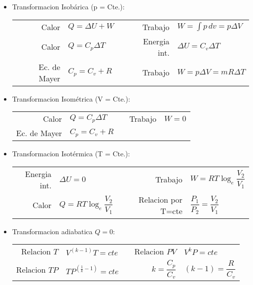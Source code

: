 \documentclass[a4paper, 11pt,titlepage]{book}
\begin{document}
\begin{tcolorbox}[title = \large\textbf{Transformaciones de gases}]

\begin{itemize}
\item Transformacion Isobárica (p = Cte.):	

	\begin{center}
			\begin{tabular}{r | l c r | l}
					\vspace{.3cm} Calor & $Q = \Delta U + W$ && Trabajo & $W = \int p\,dv = p \Delta V$\\
					\vspace{.3cm} Calor & $Q = C_p \Delta T$ && Energia int. & $\Delta U = C_v \Delta T $\\
					\vspace{.3cm} Ec. de Mayer & $C_p = C_v + R$ && Trabajo &$W = p \Delta V = mR\Delta T$ 
				\end{tabular}
		\end{center}
\item Transformacion Isométrica (V = Cte.):
		\begin{center}
		\begin{tabular}{r | l c r | l}
			\vspace{.3cm} Calor & $Q = C_p \Delta T$ && Trabajo &$W = 0 $\\
			\vspace{.3cm} Ec. de Mayer & $C_p = C_v + R$ && 
		\end{tabular}
     	\end{center}

\item Transformacion Isotérmica (T = Cte.):
       	\begin{center}
       	\begin{tabular}{r | l c r | l}
       		\vspace{.3cm} Energia int. & $\Delta U = 0$ && Trabajo &$W = RT \log_{e}\dfrac{V_2}{V_1} $\\
       		\vspace{.3cm} Calor & $Q =RT \log_{e}\dfrac{V_2}{V_1} $ && Relacion por T=cte& $\dfrac{P_1}{P_2}=\dfrac{V_2}{V_1} $
       	\end{tabular}
        \end{center}
\item Transformacion adiabatica $Q=0$:
       \begin{center}
        	\begin{tabular}{r | l c r | l}
        		\vspace{.3cm} Relacion $T$& $V^{(k-1)}T=cte$ && Relacion $PV$ &$V^kP = cte$\\
        		\vspace{.3cm} Relacion $TP$ & $ TP^{(\frac{1}{k}-1)}=cte $ && $k = \dfrac{C_p}{C_v}$& $(k - 1)=\dfrac{R}{C_v} $
        	\end{tabular}
       \end{center}


\end{itemize}
\end{tcolorbox}
\end{document}

